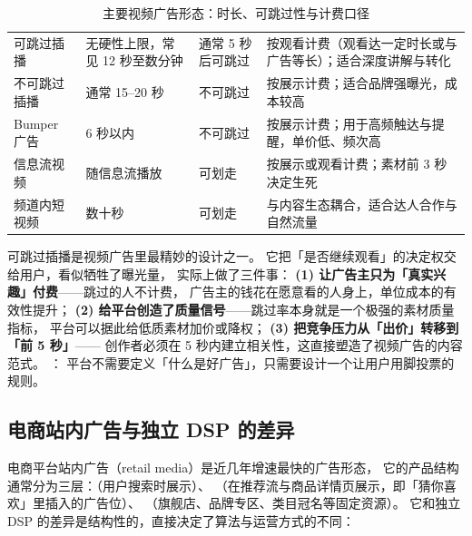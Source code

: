 \begin{table}[htbp]
\centering
\caption{主要视频广告形态：时长、可跳过性与计费口径}
\label{tab:video-formats}
\small
\begin{tabularx}{\textwidth}{L{2.6cm} L{2.2cm} L{2.6cm} Y}
\toprule
{} &  &  &  \\
\midrule
可跳过插播 & 无硬性上限，常见 12 秒至数分钟 & 通常 5 秒后可跳过 & 按观看计费（观看达一定时长或与广告等长）；适合深度讲解与转化 \\
\addlinespace
不可跳过插播 & 通常 15--20 秒 & 不可跳过 & 按展示计费；适合品牌强曝光，成本较高 \\
\addlinespace
Bumper 广告 & 6 秒以内 & 不可跳过 & 按展示计费；用于高频触达与提醒，单价低、频次高 \\
\addlinespace
信息流视频 & 随信息流播放 & 可划走 & 按展示或观看计费；素材前 3 秒决定生死 \\
\addlinespace
频道内短视频 & 数十秒 & 可划走 & 与内容生态耦合，适合达人合作与自然流量 \\
\bottomrule
\end{tabularx}
\end{table}

\begin{insight}
可跳过插播是视频广告里最精妙的设计之一。
它把「是否继续观看」的决定权交给用户，看似牺牲了曝光量，
实际上做了三件事：
\textbf{(1) 让广告主只为「真实兴趣」付费}——跳过的人不计费，
广告主的钱花在愿意看的人身上，单位成本的有效性提升；
\textbf{(2) 给平台创造了质量信号}——跳过率本身就是一个极强的素材质量指标，
平台可以据此给低质素材加价或降权；
\textbf{(3) 把竞争压力从「出价」转移到「前 5 秒」}——
创作者必须在 5 秒内建立相关性，这直接塑造了视频广告的内容范式。
：
平台不需要定义「什么是好广告」，只需要设计一个让用户用脚投票的规则。
\end{insight}

\subsection{电商站内广告与独立 DSP 的差异}

电商平台站内广告（retail media）是近几年增速最快的广告形态，
它的产品结构通常分为三层：（用户搜索时展示）、
（在推荐流与商品详情页展示，即「猜你喜欢」里插入的广告位）、
（旗舰店、品牌专区、类目冠名等固定资源）。
它和独立 DSP 的差异是结构性的，直接决定了算法与运营方式的不同：

